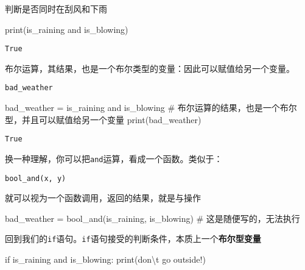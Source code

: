 \documentclass[
  letterpaper,
  DIV=11,
  numbers=noendperiod]{scrreprt}
\newenvironment{Shaded}{\begin{snugshade}}{\end{snugshade}}
\newcommand{\BuiltInTok}[1]{\textcolor[rgb]{0.00,0.23,0.31}{#1}}
\newcommand{\CharTok}[1]{\textcolor[rgb]{0.13,0.47,0.30}{#1}}
\newcommand{\CommentTok}[1]{\textcolor[rgb]{0.37,0.37,0.37}{#1}}
\newcommand{\ControlFlowTok}[1]{\textcolor[rgb]{0.00,0.23,0.31}{#1}}
\newcommand{\KeywordTok}[1]{\textcolor[rgb]{0.00,0.23,0.31}{#1}}
\newcommand{\NormalTok}[1]{\textcolor[rgb]{0.00,0.23,0.31}{#1}}
\newcommand{\OperatorTok}[1]{\textcolor[rgb]{0.37,0.37,0.37}{#1}}
\newcommand{\StringTok}[1]{\textcolor[rgb]{0.13,0.47,0.30}{#1}}
\begin{document}
判断是否同时在刮风和下雨

\begin{Shaded}
\begin{Highlighting}[]
\BuiltInTok{print}\NormalTok{(is\_raining }\KeywordTok{and}\NormalTok{ is\_blowing)}
\end{Highlighting}
\end{Shaded}

\begin{verbatim}
True
\end{verbatim}

布尔运算，其结果，也是一个布尔类型的变量：因此可以赋值给另一个变量。

\texttt{bad\_weather}

\begin{Shaded}
\begin{Highlighting}[]
\NormalTok{bad\_weather }\OperatorTok{=}\NormalTok{ is\_raining }\KeywordTok{and}\NormalTok{ is\_blowing }\CommentTok{\# 布尔运算的结果，也是一个布尔型，并且可以赋值给另一个变量}
\BuiltInTok{print}\NormalTok{(bad\_weather)}
\end{Highlighting}
\end{Shaded}

\begin{verbatim}
True
\end{verbatim}

换一种理解，你可以把\texttt{and}运算，看成一个函数。类似于：

\begin{verbatim}
bool_and(x, y)
\end{verbatim}

就可以视为一个函数调用，返回的结果，就是与操作

\begin{Shaded}
\begin{Highlighting}[]
\NormalTok{bad\_weather }\OperatorTok{=}\NormalTok{ bool\_and(is\_raining, is\_blowing) }\CommentTok{\# 这是随便写的，无法执行}
\end{Highlighting}
\end{Shaded}

回到我们的\texttt{if}语句。\texttt{if}语句接受的判断条件，本质上一个\textbf{布尔型变量}

\begin{Shaded}
\begin{Highlighting}[]
\ControlFlowTok{if}\NormalTok{ is\_raining }\KeywordTok{and}\NormalTok{ is\_blowing:}
    \BuiltInTok{print}\NormalTok{(}\StringTok{\textquotesingle{}don}\CharTok{\textbackslash{}\textquotesingle{}}\StringTok{t go outside!\textquotesingle{}}\NormalTok{)}
\end{Highlighting}
\end{Shaded}
\end{document}
